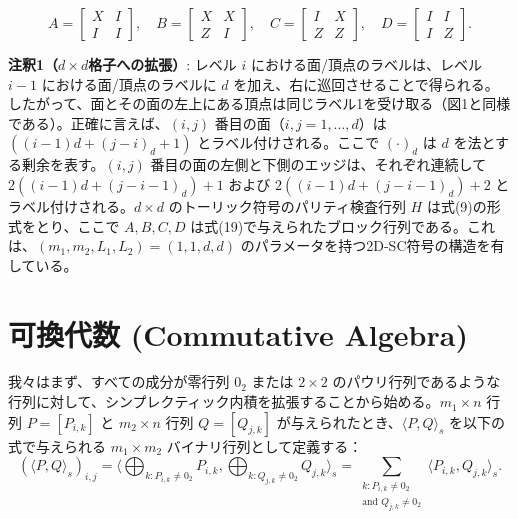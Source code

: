 \documentclass[a4paper,11pt]{article}
\begin{document}
\begin{equation}
A = \begin{bmatrix} X & I \\ I & I \end{bmatrix}, \quad
B = \begin{bmatrix} X & X \\ Z & I \end{bmatrix}, \quad
C = \begin{bmatrix} I & X \\ Z & Z \end{bmatrix}, \quad
D = \begin{bmatrix} I & I \\ I & Z \end{bmatrix}.
\end{equation}

\noindent \textbf{注釈1（$d \times d$格子への拡張）}: レベル $i$ における面/頂点のラベルは、レベル $i-1$ における面/頂点のラベルに $d$ を加え、右に巡回させることで得られる。したがって、面とその面の左上にある頂点は同じラベル1を受け取る（図1と同様である）。正確に言えば、$(i, j)$ 番目の面（$i, j = 1, \dots, d$）は $((i-1)d+(j-i)_d+1)$ とラベル付けされる。ここで $(\cdot)_d$ は $d$ を法とする剰余を表す。$(i, j)$ 番目の面の左側と下側のエッジは、それぞれ連続して $2((i-1)d+(j-i-1)_d)+1$ および $2((i-1)d+(j-i-1)_d)+2$ とラベル付けされる。$d \times d$ のトーリック符号のパリティ検査行列 $H$ は式(9)の形式をとり、ここで $A, B, C, D$ は式(19)で与えられたブロック行列である。これは、$(m_1, m_2, L_1, L_2) = (1, 1, d, d)$ のパラメータを持つ2D-SC符号の構造を有している。

\section{可換代数 (Commutative Algebra)}

我々はまず、すべての成分が零行列 $0_2$ または $2 \times 2$ のパウリ行列であるような行列に対して、シンプレクティック内積を拡張することから始める。$m_1 \times n$ 行列 $P=[P_{i,k}]$ と $m_2 \times n$ 行列 $Q=[Q_{j,k}]$ が与えられたとき、$\langle P,Q \rangle_s$ を以下の式で与えられる $m_1 \times m_2$ バイナリ行列として定義する：
\begin{equation}
(\langle P,Q \rangle_s)_{i,j} = \langle \bigoplus_{k: P_{i,k} \neq 0_2} P_{i,k}, \bigoplus_{k: Q_{j,k} \neq 0_2} Q_{j,k} \rangle_s = \sum_{\substack{k: P_{i,k} \neq 0_2 \\ \text{and } Q_{j,k} \neq 0_2}} \langle P_{i,k}, Q_{j,k} \rangle_s. \label{eq:symplectic_matrix}
\end{equation}
\end{document}
